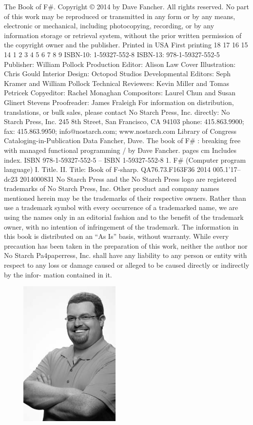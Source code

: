 \documentclass{book}
\begin{document}
The Book of F\#. Copyright © 2014 by Dave Fancher.
All rights reserved. No part of this work may be reproduced or transmitted in any form or by any means, electronic
or mechanical, including photocopying, recording, or by any information storage or retrieval system, without the
prior written permission of the copyright owner and the publisher.
Printed in USA
First printing
18 17 16 15 14   1 2 3 4 5 6 7 8 9
ISBN-10: 1-59327-552-8
ISBN-13: 978-1-59327-552-5
Publisher: William Pollock
Production Editor: Alison Law
Cover Illustration: Chris Gould
Interior Design: Octopod Studios
Developmental Editors: Seph Kramer and William Pollock
Technical Reviewers: Kevin Miller and Tomas Petricek
Copyeditor: Rachel Monaghan
Compositors: Laurel Chun and Susan Glinert Stevens
Proofreader: James Fraleigh
For information on distribution, translations, or bulk sales, please contact No Starch Press, Inc. directly:
No Starch Press, Inc.
245 8th Street, San Francisco, CA 94103
phone: 415.863.9900; fax: 415.863.9950; info@nostarch.com; www.nostarch.com
Library of Congress Cataloging-in-Publication Data
Fancher, Dave.
The book of F\# : breaking free with managed functional programming / by Dave Fancher.
pages cm
Includes index.
ISBN 978-1-59327-552-5 -- ISBN 1-59327-552-8
1. F\# (Computer program language) I. Title. II. Title: Book of F-sharp.
QA76.73.F163F36 2014
005.1'17--dc23
2014000831
No Starch Press and the No Starch Press logo are registered trademarks of No Starch Press, Inc. Other product and
company names mentioned herein may be the trademarks of their respective owners. Rather than use a trademark
symbol with every occurrence of a trademarked name, we are using the names only in an editorial fashion and to
the benefit of the trademark owner, with no intention of infringement of the trademark.
The information in this book is distributed on an “As Is” basis, without warranty. While every precaution has been
taken in the preparation of this work, neither the author nor No Starch Pa4paperress, Inc. shall have any liability to any
person or entity with respect to any loss or damage caused or alleged to be caused directly or indirectly by the infor-
mation contained in it.

\newpage{}

\begin{figure}
  \includegraphics[width=5.0cm]{../pic/Author.png}
\end{figure}
\end{document}
